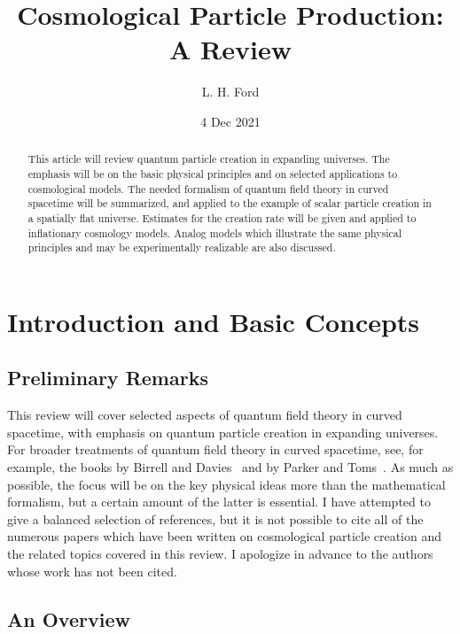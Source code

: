\documentclass[12pt,onecolumn,eqsecnum,floats,aps,prd,floatfix,titlepage,tightenlines]{revtex4-2}
\begin{document}
\title{Cosmological Particle Production: A Review}
\author{L. H. Ford}
\date{4 Dec 2021}

\begin{abstract}
This article will review quantum particle creation in expanding universes. The emphasis will be on the basic physical
principles and on selected applications to cosmological models. The needed formalism of quantum field theory in
curved spacetime will be summarized, and applied to the example of scalar particle creation in a spatially flat universe.
Estimates for the creation rate will be given and applied to inflationary cosmology models. Analog models which
illustrate the same physical principles and may be experimentally realizable are also discussed. 
\end{abstract}

\maketitle


\section{Introduction and Basic Concepts}
\label{sec:basic}

\subsection{Preliminary Remarks}
\label{sec:prelim}

This review will cover selected aspects of quantum field theory in curved spacetime, with emphasis
on quantum particle creation in expanding universes. For broader treatments of quantum field theory 
in curved spacetime, see, for example, the books by Birrell and Davies~\cite{BD} and by Parker 
and Toms~\cite{PT}. As much as possible, the focus will be on the key physical ideas more than
the mathematical formalism, but a certain amount of the latter is essential. I have attempted to give
a balanced selection of references, but it is not possible to cite all of the numerous papers which have 
been written on cosmological particle creation and the related topics covered in this review.
I apologize in advance to the authors whose work has not been cited.


\subsection{An Overview}
\label{sec:overview}
\end{document}
